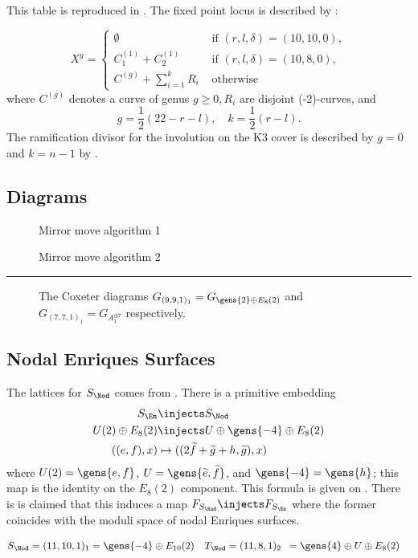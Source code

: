 \documentclass[../../main.tex]{subfiles}
\begin{document}
This table is reproduced in \cite[Table 5.1, p.553]{CD12}. The fixed point locus is described by \cite[Eqn. 5.3.1]{CD12}:

$$
X^{g}=\left\{\begin{array}{ll}
\emptyset & \text { if }(r, l, \delta)=(10,10,0), \\
C_{1}^{(1)}+C_{2}^{(1)} & \text { if }(r, l, \delta)=(10,8,0), \\
C^{(g)}+\sum_{i=1}^{k} R_{i} & \text { otherwise }
\end{array}\right.
$$
where $C^{(g)}$ denotes a curve of genus $g \geq 0, R_{i}$ are disjoint (-2)-curves, and
$$
g=\frac{1}{2}(22-r-l), \quad k=\frac{1}{2}(r-l) .
$$
The ramification divisor for the involution on the K3 cover is described by $g=0$ and $k=n-1$ by \cite[Def. 5.4.3]{CD12}.

\subsection{Diagrams}
\hfill\newline
\begin{figure}[H]
    \centering
    
    \caption{Mirror move algorithm 1}
    \label{fig:mirror-move-1}
\end{figure}

\begin{figure}[H]
    \centering
    
    \caption{Mirror move algorithm 2}
    \label{fig:mirror-move-2}
\end{figure}

\hrule

\begin{figure}[H]
\centering

    \caption{The Coxeter diagrams $G_{(9,9,1)_1} = G_{\gens{2} \oplus E_8(2)}$ and $G_{(7,7,1)_1} = G_{A_1^{\oplus 7}}$ respectively.}
    \label{fig:coble-coxeter-diagrams}
\end{figure}

\subsection{Nodal Enriques Surfaces}

The lattices for $S_{\Nod}$ comes from \cite[Prop. 3.1]{DK13}. There is a primitive embedding
\begin{align*}
    S_{\En} &\injects S_{\Nod} \\
    U(2) \oplus E_{8}(2) &\injects U \oplus \gens{-4}  \oplus E_8(2) \\
    ( (e, f), x) &\mapsto ( (2\tilde f + \tilde g + h, \tilde g), x)
\end{align*}
where $U(2) = \gens{e,f}$, $U = \gens{\tilde e, \tilde f}$, and $\gens{-4} = \gens{h}$; this map is the identity on the $E_8(2)$ component. This formula is given on \cite[p.\, 561]{CD12}. There is is claimed that this induces a map $F_{S_{\Nod}} \injects F_{S_{\En}}$ where the former coincides with the moduli space of nodal Enriques surfaces.

\begin{align*}
S_{\Nod} &= (11, 10, 1)_1 = \gens{-4} \oplus E_{10}(2) & T_{\Nod} &= (11, 8, 1)_2 \,\,\,= \gens{4} \oplus U \oplus E_8(2)
\end{align*}
\end{document}
